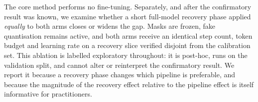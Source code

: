 The core method performs no fine-tuning. Separately, and after the confirmatory result was
known, we examine whether a short full-model recovery phase applied \emph{equally} to both
arms closes or widens the gap. Masks are frozen, fake quantisation remains active, and both
arms receive an identical step count, token budget and learning rate on a recovery slice
verified disjoint from the calibration set. This ablation is labelled exploratory throughout:
it is post-hoc, runs on the validation split, and cannot alter or reinterpret the
confirmatory result. We report it because a recovery phase changes which pipeline is
preferable, and because the magnitude of the recovery effect relative to the pipeline effect
is itself informative for practitioners.

%
%
%
